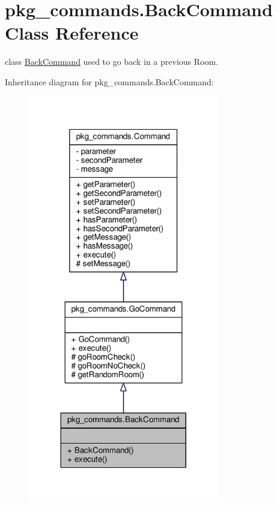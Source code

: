 \hypertarget{classpkg__commands_1_1BackCommand}{\section{pkg\-\_\-commands.\-Back\-Command Class Reference}
\label{classpkg__commands_1_1BackCommand}
}


class \hyperlink{classpkg__commands_1_1BackCommand}{Back\-Command} used to go back in a previous Room.  




Inheritance diagram for pkg\-\_\-commands.\-Back\-Command\-:\nopagebreak
\begin{figure}[H]
\begin{center}
\leavevmode
\includegraphics[width=236pt]{classpkg__commands_1_1BackCommand__inherit__graph}
\end{center}
\end{figure}


